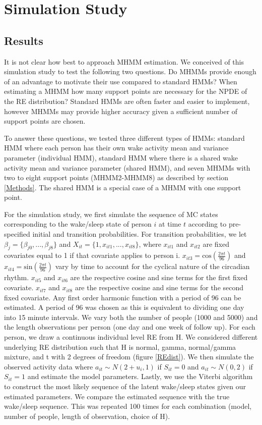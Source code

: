 \documentclass{article}
\begin{document}
\newpage

\section{Simulation Study}\label{SimStudy}

\subsection{Results}\label{SimStudyResults}

It is not clear how best to approach MHMM estimation. We conceived of this simulation study to test the following two questions. Do MHMMs provide enough of an advantage to motivate their use compared to standard HMMs? When estimating a MHMM how many support points are necessary for the NPDE of the RE distribution? Standard HMMs are often faster and easier to implement, however MHMMs may provide higher accuracy given a sufficient number of support points are chosen.

To answer these questions, we tested three different types of HMMs: standard HMM where each person has their own wake activity mean and variance parameter (individual HMM), standard HMM where there is a shared wake activity mean and variance parameter (shared HMM), and seven MHMMs with two to eight support points (MHMM2-MHMM8) as described by section \ref{Methods}. The shared HMM is a special case of a MHMM with one support point. 

For the simulation study, we first simulate the sequence of MC states corresponding to the wake/sleep state of person $i$ at time $t$ according to pre-specified initial and transition probabilities. For transition probabilities, we let $\beta_j = \{\beta_{j0}, ..., \beta_{j8}\}$ and $X_{it} = \{1, x_{it1}, ..., x_{it8}\}$, where $x_{it1}$ and $x_{it2}$ are fixed covariates equal to 1 if that covariate applies to person i. $x_{it3} = \text{cos}(\frac{2\pi t}{96})$ and $x_{it4} = \text{sin}(\frac{2\pi t}{96})$ vary by time to account for the cyclical nature of the circadian rhythm. $x_{it5}$ and $x_{it6}$ are the respective cosine and sine terms for the first fixed covariate. $x_{it7}$ and $x_{it8}$ are the respective cosine and sine terms for the second fixed covariate. Any first order harmonic function with a period of 96 can be estimated. A period of 96 was chosen as this is equivalent to dividing one day into 15 minute intervals. We vary both the number of people (1000 and 5000) and the length observations per person (one day and one week of follow up). For each person, we draw a continuous individual level RE from H. We considered different underlying RE distribution such that H is normal, gamma, normal/gamma mixture, and t with 2 degrees of freedom (figure \ref{REdist}). We then simulate the observed activity data where $a_{it} \sim N(2+u_i,1)$ if $S_{it}=0$ and $a_{it} \sim N(0,2)$ if $S_{it}=1$ and estimate the model parameters. Lastly, we use the Viterbi algorithm to construct the most likely sequence of the latent wake/sleep states given our estimated parameters. We compare the estimated sequence with the true wake/sleep sequence. This was repeated 100 times for each combination (model, number of people, length of observation, choice of H).
\end{document}
